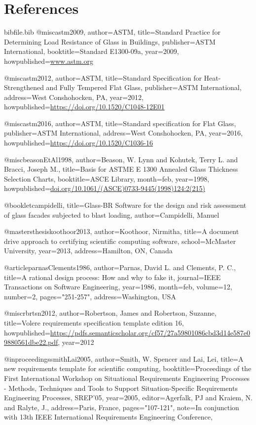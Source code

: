 \documentclass[12pt]{article}
\begin{document}
\section{References}
\label{Sec:References}
\begin{filecontents*}{bibfile.bib}
@misc{astm2009,
author={ASTM},
title={Standard Practice for Determining Load Resistance of Glass in Buildings},
publisher={ASTM International},
booktitle={Standard E1300-09a},
year={2009},
howpublished={\url{www.astm.org}}}

@misc{astm2012,
author={ASTM},
title={Standard Specification for Heat-Strengthened and Fully Tempered Flat Glass},
publisher={ASTM International},
address={West Conshohocken, PA},
year={2012},
howpublished={\url{https://doi.org/10.1520/C1048-12E01}}}

@misc{astm2016,
author={ASTM},
title={Standard specification for Flat Glass},
publisher={ASTM International},
address={West Conshohocken, PA},
year={2016},
howpublished={\url{https://doi.org/10.1520/C1036-16}}}

@misc{beasonEtAl1998,
author={Beason, W. Lynn and Kohutek, Terry L. and Bracci, Joseph M.},
title={Basis for ASTME E 1300 Annealed Glass Thickness Selection Charts},
booktitle={ASCE Library},
month={feb},
year={1998},
howpublished={\url{doi.org/10.1061/(ASCE)0733-9445(1998)124:2(215)}}}

@booklet{campidelli,
title={Glass-BR Software for the design and risk assessment of glass facades subjected to blast loading},
author={Campidelli, Manuel}}

@mastersthesis{koothoor2013,
author={Koothoor, Nirmitha},
title={A document drive approach to certifying scientific computing software},
school={McMaster University},
year={2013},
address={Hamilton, ON, Canada}}

@article{parnasClements1986,
author={Parnas, David L. and Clements, P. C.},
title={A rational design process: How and why to fake it},
journal={IEEE Transactions on Software Engineering},
year={1986},
month={feb},
volume={12},
number={2},
pages={"251-257"},
address={Washington, USA}}

@misc{rbrtsn2012,
author={Robertson, James and Robertson, Suzanne},
title={Volere requirements specification template edition 16},
howpublished={\url{https://pdfs.semanticscholar.org/cf57/27a59801086cbd3d14e587e09880561dbe22.pdf}},
year={2012}}

@inproceedings{smithLai2005,
author={Smith, W. Spencer and Lai, Lei},
title={A new requirements template for scientific computing},
booktitle={Proceedings of the First International Workshop on Situational Requirements Engineering Processes - Methods, Techniques and Tools to Support Situation-Specific Requirements Engineering Processes, SREP'05},
year={2005},
editor={Agerfalk, PJ and Kraiem, N. and Ralyte, J.},
address={Paris, France},
pages={"107-121"},
note={In conjunction with 13th IEEE International Requirements Engineering Conference,}}
\end{filecontents*}
\nocite{*}
\printbibliography[heading=none]
\end{document}
